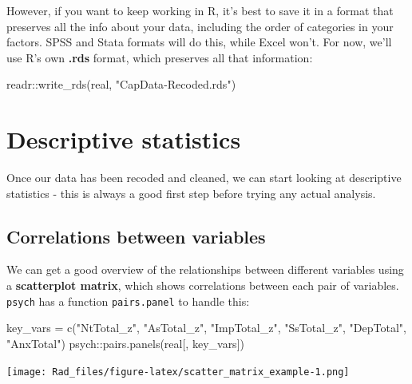 \documentclass[
]{book}
\newenvironment{Shaded}{\begin{snugshade}}{\end{snugshade}}
\newcommand{\FunctionTok}[1]{\textcolor[rgb]{0.00,0.00,0.00}{#1}}
\newcommand{\NormalTok}[1]{#1}
\newcommand{\OtherTok}[1]{\textcolor[rgb]{0.56,0.35,0.01}{#1}}
\newcommand{\SpecialCharTok}[1]{\textcolor[rgb]{0.00,0.00,0.00}{#1}}
\newcommand{\StringTok}[1]{\textcolor[rgb]{0.31,0.60,0.02}{#1}}
\begin{document}
However, if you want to keep working in R, it's best
to save it in a format that preserves all the info
about your data, including the order of categories
in your factors. SPSS and Stata formats will do this,
while Excel won't. For now, we'll use R's own
\textbf{.rds} format, which preserves all that information:

\begin{Shaded}
\begin{Highlighting}[]
\NormalTok{readr}\SpecialCharTok{::}\FunctionTok{write\_rds}\NormalTok{(real, }\StringTok{"CapData{-}Recoded.rds"}\NormalTok{)}
\end{Highlighting}
\end{Shaded}

\hypertarget{descriptive-statistics-1}{%
\section{Descriptive statistics}\label{descriptive-statistics-1}}

Once our data has been recoded and cleaned, we can
start looking at descriptive statistics - this
is always a good first step before trying any actual
analysis.

\hypertarget{correlations-between-variables}{%
\subsection{Correlations between variables}\label{correlations-between-variables}}

We can get a good overview of the relationships between
different variables using a \textbf{scatterplot matrix},
which shows correlations between each pair of variables.
\texttt{psych} has a function \texttt{pairs.panel} to handle this:

\begin{Shaded}
\begin{Highlighting}[]
\NormalTok{key\_vars }\OtherTok{=} \FunctionTok{c}\NormalTok{(}\StringTok{"NtTotal\_z"}\NormalTok{, }\StringTok{"AsTotal\_z"}\NormalTok{, }\StringTok{"ImpTotal\_z"}\NormalTok{, }
             \StringTok{"SsTotal\_z"}\NormalTok{, }\StringTok{"DepTotal"}\NormalTok{, }\StringTok{"AnxTotal"}\NormalTok{)}
\NormalTok{psych}\SpecialCharTok{::}\FunctionTok{pairs.panels}\NormalTok{(real[, key\_vars])}
\end{Highlighting}
\end{Shaded}

\texttt{[image: Rad\_files/figure-latex/scatter\_matrix\_example-1.png]}
\end{document}
